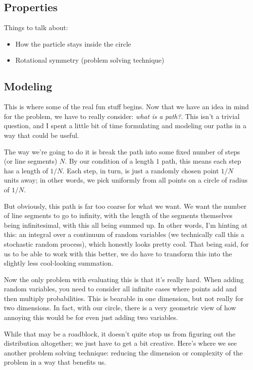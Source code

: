 \subsection*{Properties}

Things to talk about:
\begin{itemize}
    \item How the particle stays inside the circle
    \item Rotational symmetry (problem solving technique)
\end{itemize}

\subsection*{Modeling}

This is where some of the real fun stuff begins. Now that we have an idea in
mind for the problem, we have to really consider: \textit{what is a path?}.
This isn't a trivial question, and I spent a little bit of time formulating and
modeling our paths in a way that could be useful.

The way we're going to do it is break the path into some fixed number of steps
(or line segments) \( N \). By our condition of a length \( 1 \) path, this
means each step has a length of \( 1 / N \). Each step, in turn, is just a
randomly chosen point \( 1 / N \) units away; in other words, we pick uniformly
from all points on a circle of radius of \( 1 / N \).

But obviously, this path is far too coarse for what we want. We want the number
of line segments to go to infinity, with the length of the segments themselves
being infinitesimal, with this all being summed up. In other words, I'm hinting
at this: an integral over a continuum of random variables (we technically call
this a stochastic random process), which honestly looks pretty cool. That being
said, for us to be able to work with this better, we do have to transform this
into the slightly less cool-looking summation.

Now the only problem with evaluating this is that it's really hard. When adding
random variables, you need to consider all infinite cases where points add and
then multiply probabilities. This is bearable in one dimension, but not really
for two dimensions. In fact, with our circle, there is a very geometric view of how
annoying this would be for even just adding two variables.

While that may be a roadblock, it doesn't quite stop us from figuring out the
distribution altogether; we just have to get a bit creative. Here's where we
see another problem solving technique: reducing the dimension or complexity of
the problem in a way that benefits us.

